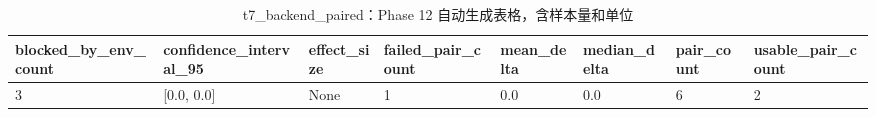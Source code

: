 \begin{table}[htbp]
\centering
\caption{t7_backend_paired：Phase 12 自动生成表格，含样本量和单位}
\begin{tabular}{llllllll}
\hline
blocked_by_env_count & confidence_interval_95 & effect_size & failed_pair_count & mean_delta & median_delta & pair_count & usable_pair_count \\
\hline
3 & [0.0, 0.0] & None & 1 & 0.0 & 0.0 & 6 & 2 \\
\hline
\end{tabular}
\end{table}
